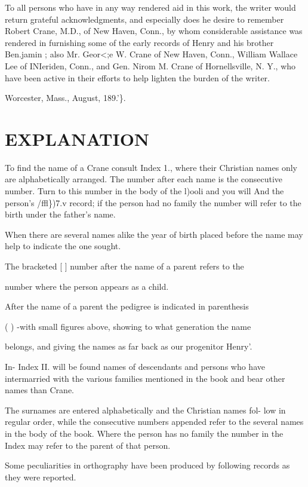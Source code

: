 \documentclass[oneside]{book}
\begin{document}
To all persons who have in any way rendered aid in this work, 
the writer would return grateful acknowledgments, and especially 
does he desire to remember Robert Crane, M.D., of New 
Haven, Conn., by whom considerable assistance was rendered in 
furnishing some of the early records of Henry and his brother 
Ben.jamin ; also Mr. Geor<;e W. Crane of New Haven, Conn., 
William Wallace Lee of INIeriden, Conn., and Gen. Nirom M. 
Crane of Hornellsville, N. Y., who have been active in their 
efforts to help lighten the burden of the writer. 


Worcester, Mass., August, 189.'\}. 



\section{EXPLANATION} 



To find the name of a Crane consult Index 1., where their Christian 
names only are alphabetically arranged. The number after each name 
is the consecutive number. Turn to this number in the body of the 
l)ooli and you will And the person's /ffl\})7.v record; if the person had no 
family the number will refer to the birth under the father's name. 

When there are several names alike the year of birth placed before the 
name may help to indicate the one sought. 

The bracketed [ ] number after the name of a parent refers to the 

number where the person appears as a child. 

After the name of a parent the pedigree is indicated in parenthesis 

( ) -with small figures above, showing to what generation the name 

belongs, and giving the names as far back as our progenitor Henry'. 

In- Index II. will be found names of descendants and persons who 
have intermarried with the various families mentioned in the book and 
bear other names than Crane. 

The surnames are entered alphabetically and the Christian names fol- 
low in regular order, while the consecutive numbers appended refer to 
the several names in the body of the book. Where the person has no 
family the number in the Index may refer to the parent of that person. 

Some peculiarities in orthography have been produced by following 
records as they were reported. 
\end{document}
